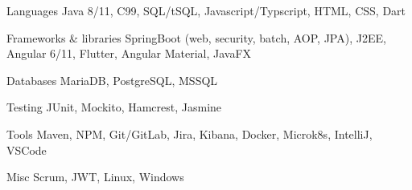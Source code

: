


\begin{cvskills}


\cvskill
{Languages} %
{Java 8/11, C99, SQL/tSQL, Javascript/Typscript, HTML, CSS, Dart} %


\cvskill
{Frameworks \& libraries} %
{SpringBoot (web, security, batch, AOP, JPA), J2EE, Angular 6/11, Flutter, Angular Material, JavaFX} %


\cvskill
{Databases} %
{MariaDB, PostgreSQL, MSSQL} %

\cvskill
{Testing} %
{JUnit, Mockito, Hamcrest, Jasmine} %

\cvskill
{Tools} %
{Maven, NPM, Git/GitLab, Jira, Kibana, Docker, Microk8s, IntelliJ, VSCode} %


\cvskill
{Misc} %
{Scrum, JWT, Linux, Windows} %

\end{cvskills}
